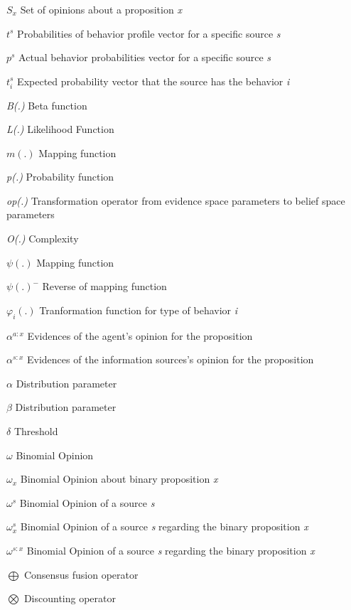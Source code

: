 \documentclass[a4,12pt]{ozu-thesis}
\begin{document}
\begin{preliminary}
\begin{abbrv}
\item[$S_{x}$]                     Set of opinions about a proposition \textit{x}
\item[$t^{s}$]                     Probabilities of behavior profile vector for a specific source \textit{s} 
\item[$p^{s}$]                     Actual behavior probabilities vector for a specific source \textit{s} 
\item[$t^{s}_{i}$]                 Expected probability vector that the source has the behavior \textit{i}
\\
\item[ \textit{ B(.)}]                    Beta function
\item[\textit{ L(.)}]                     Likelihood Function
\item[ $ m(.)$]                       Mapping function
\item[\textit{ p(.)}]                     Probability function
\item[\textit{ op(.)}]                    Transformation operator from evidence space parameters to belief space parameters
\item[\textit{ O(.)}]                     Complexity 
\item[$\psi (.)$]                         Mapping function
\item[$\psi (.) ^{-}$]                    Reverse of mapping function
\item[$\varphi _{i}(.)$]                  Tranformation function for type of behavior \textit{i}
\item[$\alpha^{a:x}$]                     Evidences of the agent's opinion for the proposition
\item[$\alpha^{s:x}$]                     Evidences of the information sources's opinion for the proposition
\\
\item[ $\alpha$]                               Distribution parameter
\item[ $\beta$]                                Distribution parameter
\item[$\delta$]                                Threshold
\item[ $\omega$ ]                              Binomial Opinion	
\item[ $\omega_{x}$]                           Binomial Opinion about binary proposition \textit{x}
\item[ $\omega^{s}$]                           Binomial Opinion of a source \textit{s}
\item[$\omega^{s}_{x}$]                     Binomial Opinion of a source \textit{s} regarding the binary proposition \textit{x}
\item[$\omega^{s:x}$]                     Binomial Opinion of a source \textit{s} regarding the binary proposition \textit{x}
\item[$\bigoplus $]                            Consensus fusion operator
\item[$\bigotimes $]                          Discounting operator


\end{abbrv}
\end{preliminary}
\end{document}
